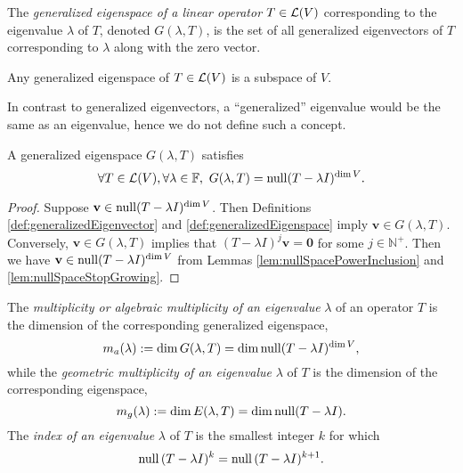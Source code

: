 \begin{defn}
  \label{def:generalizedEigenspace}
  The \emph{generalized eigenspace of a linear operator}
  $T\in{\cal L}(V)$ corresponding to the eigenvalue $\lambda$ of $T$,
  denoted $G(\lambda,T)$, 
  is the set of all generalized eigenvectors of $T$ corresponding
  to $\lambda$ along with the zero vector.
\end{defn}

\begin{rem}
  Any generalized eigenspace of $T\in{\cal L}(V)$
  is a subspace of $V$.
\end{rem}

\begin{rem}
  In contrast to generalized eigenvectors,
  a ``generalized'' eigenvalue would be the same as an eigenvalue,
  hence we do not define such a concept.
\end{rem}

\begin{lem}
  \label{lem:generalizedEigenspace}
  A generalized eigenspace $G(\lambda, T)$ satisfies
  \begin{equation}
    \label{eq:generalizedEigenspace}
    \forall T\in{\cal L}(V), \forall \lambda\in \mathbb{F},\ 
    G(\lambda, T) = \Null(T-\lambda I)^{\dim V}.
  \end{equation}
\end{lem}
\begin{proof}
  Suppose $\mathbf{v}\in \mathrm{null}(T-\lambda I)^{\dim V}$.
  Then Definitions \ref{def:generalizedEigenvector}
  and \ref{def:generalizedEigenspace} imply
  $\mathbf{v}\in G(\lambda,T)$.
  Conversely, $\mathbf{v}\in G(\lambda,T)$ implies
  that $(T-\lambda I)^j \mathbf{v} = \mathbf{0}$
  for some $j\in \mathbb{N}^+$.
  Then we have $\mathbf{v}\in \mathrm{null}(T-\lambda I)^{\dim V}$
  from Lemmas \ref{lem:nullSpacePowerInclusion}
  and \ref{lem:nullSpaceStopGrowing}.
\end{proof}

\begin{defn}
  \label{def:eigenvalueMultiplicity}
  The \emph{multiplicity or algebraic multiplicity
    of an eigenvalue} $\lambda$ of an operator $T$
  is the dimension of the corresponding generalized eigenspace,
  \begin{equation}
    \label{eq:algebraicMultiplicity}
    m_a(\lambda) := \dim G(\lambda, T)
    = \dim \mathrm{null}(T-\lambda I)^{\dim V}, 
  \end{equation}
  while the \emph{geometric multiplicity
    of an eigenvalue} $\lambda$ of $T$
  is the dimension of the corresponding eigenspace,
  \begin{equation}
    \label{eq:geometricMultiplicity}
    m_g(\lambda) := \dim E(\lambda, T)
    = \dim \mathrm{null}(T-\lambda I).
  \end{equation}
  The \emph{index of an eigenvalue} $\lambda$ of $T$
  is the smallest integer $k$ for which
  \begin{equation}
    \mathrm{null}\,(T-\lambda I)^k = \mathrm{null}\,(T-\lambda I)^{k+1}.
  \end{equation}
\end{defn}

